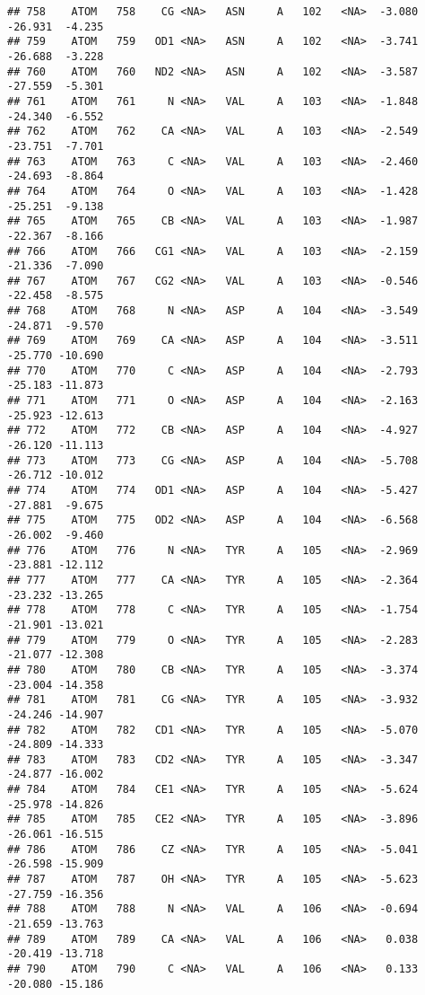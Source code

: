 \documentclass[
]{article}
\begin{document}
\begin{verbatim}
## 758    ATOM   758    CG <NA>   ASN     A   102   <NA>  -3.080 -26.931  -4.235
## 759    ATOM   759   OD1 <NA>   ASN     A   102   <NA>  -3.741 -26.688  -3.228
## 760    ATOM   760   ND2 <NA>   ASN     A   102   <NA>  -3.587 -27.559  -5.301
## 761    ATOM   761     N <NA>   VAL     A   103   <NA>  -1.848 -24.340  -6.552
## 762    ATOM   762    CA <NA>   VAL     A   103   <NA>  -2.549 -23.751  -7.701
## 763    ATOM   763     C <NA>   VAL     A   103   <NA>  -2.460 -24.693  -8.864
## 764    ATOM   764     O <NA>   VAL     A   103   <NA>  -1.428 -25.251  -9.138
## 765    ATOM   765    CB <NA>   VAL     A   103   <NA>  -1.987 -22.367  -8.166
## 766    ATOM   766   CG1 <NA>   VAL     A   103   <NA>  -2.159 -21.336  -7.090
## 767    ATOM   767   CG2 <NA>   VAL     A   103   <NA>  -0.546 -22.458  -8.575
## 768    ATOM   768     N <NA>   ASP     A   104   <NA>  -3.549 -24.871  -9.570
## 769    ATOM   769    CA <NA>   ASP     A   104   <NA>  -3.511 -25.770 -10.690
## 770    ATOM   770     C <NA>   ASP     A   104   <NA>  -2.793 -25.183 -11.873
## 771    ATOM   771     O <NA>   ASP     A   104   <NA>  -2.163 -25.923 -12.613
## 772    ATOM   772    CB <NA>   ASP     A   104   <NA>  -4.927 -26.120 -11.113
## 773    ATOM   773    CG <NA>   ASP     A   104   <NA>  -5.708 -26.712 -10.012
## 774    ATOM   774   OD1 <NA>   ASP     A   104   <NA>  -5.427 -27.881  -9.675
## 775    ATOM   775   OD2 <NA>   ASP     A   104   <NA>  -6.568 -26.002  -9.460
## 776    ATOM   776     N <NA>   TYR     A   105   <NA>  -2.969 -23.881 -12.112
## 777    ATOM   777    CA <NA>   TYR     A   105   <NA>  -2.364 -23.232 -13.265
## 778    ATOM   778     C <NA>   TYR     A   105   <NA>  -1.754 -21.901 -13.021
## 779    ATOM   779     O <NA>   TYR     A   105   <NA>  -2.283 -21.077 -12.308
## 780    ATOM   780    CB <NA>   TYR     A   105   <NA>  -3.374 -23.004 -14.358
## 781    ATOM   781    CG <NA>   TYR     A   105   <NA>  -3.932 -24.246 -14.907
## 782    ATOM   782   CD1 <NA>   TYR     A   105   <NA>  -5.070 -24.809 -14.333
## 783    ATOM   783   CD2 <NA>   TYR     A   105   <NA>  -3.347 -24.877 -16.002
## 784    ATOM   784   CE1 <NA>   TYR     A   105   <NA>  -5.624 -25.978 -14.826
## 785    ATOM   785   CE2 <NA>   TYR     A   105   <NA>  -3.896 -26.061 -16.515
## 786    ATOM   786    CZ <NA>   TYR     A   105   <NA>  -5.041 -26.598 -15.909
## 787    ATOM   787    OH <NA>   TYR     A   105   <NA>  -5.623 -27.759 -16.356
## 788    ATOM   788     N <NA>   VAL     A   106   <NA>  -0.694 -21.659 -13.763
## 789    ATOM   789    CA <NA>   VAL     A   106   <NA>   0.038 -20.419 -13.718
## 790    ATOM   790     C <NA>   VAL     A   106   <NA>   0.133 -20.080 -15.186

\end{verbatim}
\end{document}
